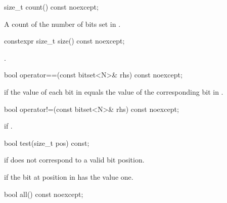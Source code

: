 %
\begin{itemdecl}
size_t count() const noexcept;
\end{itemdecl}

\begin{itemdescr}
\pnum
\returns
A count of the number of bits set in
.
\end{itemdescr}

%
\begin{itemdecl}
constexpr size_t size() const noexcept;
\end{itemdecl}

\begin{itemdescr}
\pnum
\returns
{}.
\end{itemdescr}

%
\begin{itemdecl}
bool operator==(const bitset<N>& rhs) const noexcept;
\end{itemdecl}

\begin{itemdescr}
\pnum
\returns
{} if the value of each bit in
equals the value of the corresponding bit in .
\end{itemdescr}

%
\begin{itemdecl}
bool operator!=(const bitset<N>& rhs) const noexcept;
\end{itemdecl}

\begin{itemdescr}
\pnum
\returns
{} if
.
\end{itemdescr}

%
\begin{itemdecl}
bool test(size_t pos) const;
\end{itemdecl}

\begin{itemdescr}
\pnum
\throws
{}
if  does not correspond to a valid bit position.%

\pnum
\returns
{}
if the bit at position 
in
has the value one.
\end{itemdescr}

%
\begin{itemdecl}
bool all() const noexcept;
\end{itemdecl}

